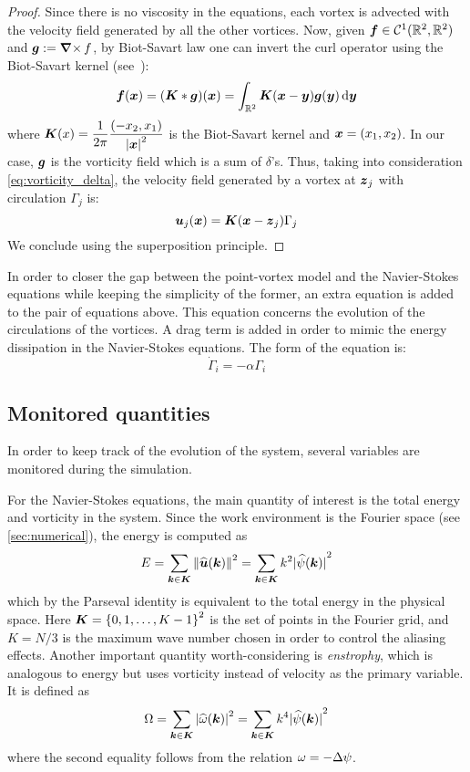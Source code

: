 \documentclass[../main.tex]{subfiles}
\begin{document}
\begin{proof}
	Since there is no viscosity in the equations, each vortex is advected with the velocity field generated by all the other vortices. Now, given $\boldsymbol{f}\in \mathcal{C}^1(\mathbb{R}^2,\mathbb{R}^2)$ and $\boldsymbol{g}:=\operatorname{\boldsymbol{\nabla}\times} f$, by Biot-Savart law one can invert the curl operator using the Biot-Savart kernel (see~\cite{Griffiths}):
	\begin{equation}
		\boldsymbol{f}(\boldsymbol{x}) = (\boldsymbol{K} * \boldsymbol{g})(\boldsymbol{x}) = \int_{\mathbb{R}^2} \boldsymbol{K}(\boldsymbol{x}-\boldsymbol{y}) \boldsymbol{g}(\boldsymbol{y}) \dd{\boldsymbol{y}}
	\end{equation}
	where $\displaystyle\boldsymbol{K}(x) = \frac{1}{2\pi} \frac{(-x_2,x_1)}{{\abs{\boldsymbol{x}}^2}}$ is the Biot-Savart kernel and $\boldsymbol{x}=(x_1,x_2)$. In our case, $\boldsymbol{g}$ is the vorticity field which is a sum of $\delta$'s. Thus, taking into consideration \cref{eq:vorticity_delta}, the velocity field generated by a vortex at $\boldsymbol{z}_j$ with circulation $\Gamma_j$ is:
	\begin{equation}
		\boldsymbol{u}_j(\boldsymbol{x}) = \boldsymbol{K}(\boldsymbol{x}-\boldsymbol{z}_j) \Gamma_j
	\end{equation}
	We conclude using the superposition principle.
\end{proof}
In order to closer the gap between the point-vortex model and the Navier-Stokes equations while keeping the simplicity of the former, an extra equation is added to the pair of equations above. This equation concerns the evolution of the circulations of the vortices. A drag term is added in order to mimic the energy dissipation in the Navier-Stokes equations. The form of the equation is:
\begin{equation}
	\dot{\Gamma}_i = -\alpha \Gamma_i
\end{equation}

\subsection{Monitored quantities}
In order to keep track of the evolution of the system, several variables are monitored during the simulation.

For the Navier-Stokes equations, the main quantity of interest is the total energy and vorticity in the system. Since the work environment is the Fourier space (see \cref{sec:numerical}), the energy is computed as
\begin{equation}
	E = \sum_{\boldsymbol{k}\in\boldsymbol{K}} \left\|\widehat{\boldsymbol{u}}(\boldsymbol{k})\right\|^2 = \sum_{\boldsymbol{k}\in\boldsymbol{K}} k^2 {|\widehat{\psi}(\boldsymbol{k})|}^2
\end{equation}
which by the Parseval identity is equivalent to the total energy in the physical space. Here $\boldsymbol{K} = {\{0,1,\ldots,K-1\}}^2$ is the set of points in the Fourier grid, and $K=N/3$ is the maximum wave number chosen in order to control the aliasing effects. Another important quantity worth-considering is \emph{enstrophy}, which is analogous to energy but uses vorticity instead of velocity as the primary variable. It is defined as
\begin{equation}
	\Omega = \sum_{\boldsymbol{k}\in\boldsymbol{K}} {|\widehat{\omega}(\boldsymbol{k})|}^2 = \sum_{\boldsymbol{k}\in\boldsymbol{K}} k^4 {|\widehat{\psi}(\boldsymbol{k})|}^2
\end{equation}
where the second equality follows from the relation $\omega = -\Delta \psi$.
\end{document}
